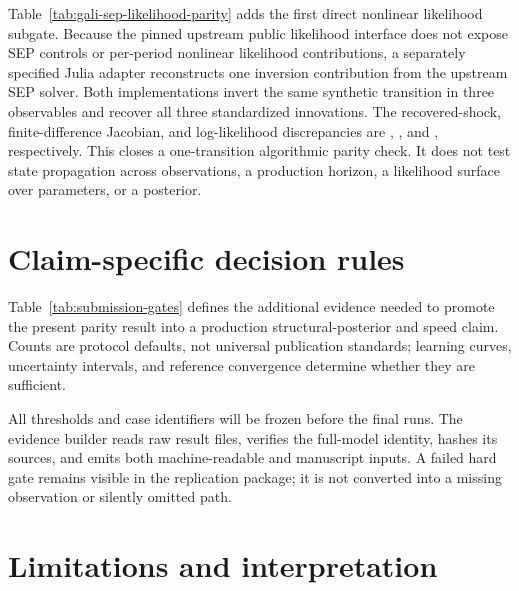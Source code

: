 \documentclass[11pt]{article}
\begin{document}
Table~\ref{tab:gali-sep-likelihood-parity} adds the first direct nonlinear
likelihood subgate. Because the pinned upstream public likelihood interface does
not expose SEP controls or per-period nonlinear likelihood contributions, a
separately specified Julia adapter reconstructs one inversion contribution from
the upstream SEP solver. Both implementations invert the same synthetic
transition in three observables and recover all three standardized innovations.
The recovered-shock, finite-difference Jacobian, and log-likelihood
discrepancies are \GaliSEPLLShockMax{}, \GaliSEPLLJacobianMax{}, and
\GaliSEPLLAbs{}, respectively. This closes a one-transition algorithmic parity
check. It does not test state propagation across observations, a production
horizon, a likelihood surface over parameters, or a posterior.

\section{Claim-specific decision rules}

Table~\ref{tab:submission-gates} defines the additional evidence needed to
promote the present parity result into a production structural-posterior and
speed claim. Counts are protocol defaults, not universal publication standards;
learning curves, uncertainty intervals, and reference convergence determine
whether they are sufficient.



All thresholds and case identifiers will be frozen before the final runs. The
evidence builder reads raw result files, verifies the full-model identity, hashes
its sources, and emits both machine-readable and manuscript inputs. A failed
hard gate remains visible in the replication package; it is not converted into
a missing observation or silently omitted path.

\section{Limitations and interpretation}
\end{document}
